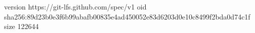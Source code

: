 version https://git-lfs.github.com/spec/v1
oid sha256:89d23b0e3f6b99abafb00835e4ad450052e83d6203d0e10c8499f2bda0d74c1f
size 122644
